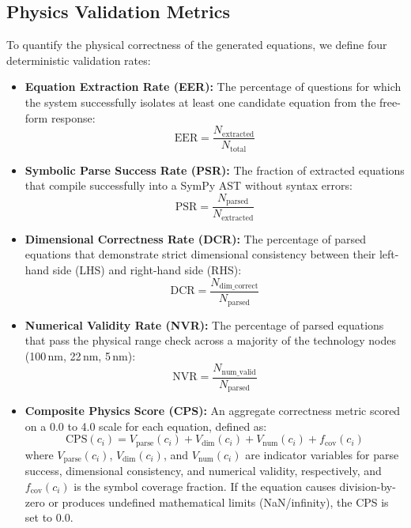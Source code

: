\documentclass[a4paper,fleqn]{cas-sc}
\begin{document}
\subsection{Physics Validation Metrics}
To quantify the physical correctness of the generated equations, we define four deterministic validation rates:
\begin{itemize}
    \item \textbf{Equation Extraction Rate (EER):} The percentage of questions for which the system successfully isolates at least one candidate equation from the free-form response:
    \begin{equation*}
        \mathrm{EER} = \frac{N_{\mathrm{extracted}}}{N_{\mathrm{total}}}
    \end{equation*}
    \item \textbf{Symbolic Parse Success Rate (PSR):} The fraction of extracted equations that compile successfully into a SymPy AST without syntax errors:
    \begin{equation*}
        \mathrm{PSR} = \frac{N_{\mathrm{parsed}}}{N_{\mathrm{extracted}}}
    \end{equation*}
    \item \textbf{Dimensional Correctness Rate (DCR):} The percentage of parsed equations that demonstrate strict dimensional consistency between their left-hand side (LHS) and right-hand side (RHS):
    \begin{equation*}
        \mathrm{DCR} = \frac{N_{\mathrm{dim\_correct}}}{N_{\mathrm{parsed}}}
    \end{equation*}
    \item \textbf{Numerical Validity Rate (NVR):} The percentage of parsed equations that pass the physical range check across a majority of the technology nodes (100\,nm, 22\,nm, 5\,nm):
    \begin{equation*}
        \mathrm{NVR} = \frac{N_{\mathrm{num\_valid}}}{N_{\mathrm{parsed}}}
    \end{equation*}
    \item \textbf{Composite Physics Score (CPS):} An aggregate correctness metric scored on a 0.0 to 4.0 scale for each equation, defined as:
    \begin{equation*}
        \mathrm{CPS}(c_i) = V_{\mathrm{parse}}(c_i) + V_{\mathrm{dim}}(c_i) + V_{\mathrm{num}}(c_i) + f_{\mathrm{cov}}(c_i)
    \end{equation*}
    where $V_{\mathrm{parse}}(c_i)$, $V_{\mathrm{dim}}(c_i)$, and $V_{\mathrm{num}}(c_i)$ are indicator variables for parse success, dimensional consistency, and numerical validity, respectively, and $f_{\mathrm{cov}}(c_i)$ is the symbol coverage fraction. If the equation causes division-by-zero or produces undefined mathematical limits (NaN/infinity), the CPS is set to $0.0$.
\end{itemize}
\end{document}
